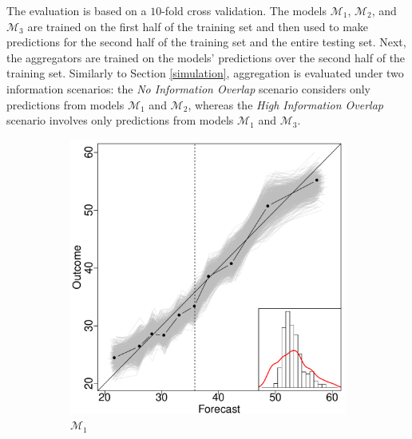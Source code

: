 \documentclass[11pt]{article}
\theoremstyle{definition}
\theoremstyle{definition}
\begin{document}
The evaluation is based on a $10$-fold cross validation. The models $\mathcal{M}_1$, $\mathcal{M}_2$, and $\mathcal{M}_3$ are trained on the first half of the training set and then used to make  predictions for the second half of the training set and the entire testing set. Next, the aggregators are  trained on the models' predictions over the second half of the training set. Similarly to Section \ref{simulation}, aggregation is evaluated under two information scenarios: the \textit{No Information Overlap} scenario considers only predictions from models $\mathcal{M}_1$ and $\mathcal{M}_2$, whereas the \textit{High Information Overlap} scenario involves only predictions from models $\mathcal{M}_1$ and $\mathcal{M}_3$. 

\begin{figure}
        \centering
        \begin{subfigure}[b]{0.24\textwidth}
                \includegraphics[width=\textwidth]{IndependentModel1}
                \caption{$\mathcal{M}_1$}
                \label{fig:gull}
        \end{subfigure}%
        ~ %
        \begin{subfigure}[b]{0.24\textwidth}

\end{subfigure}
\end{figure}
\end{document}
